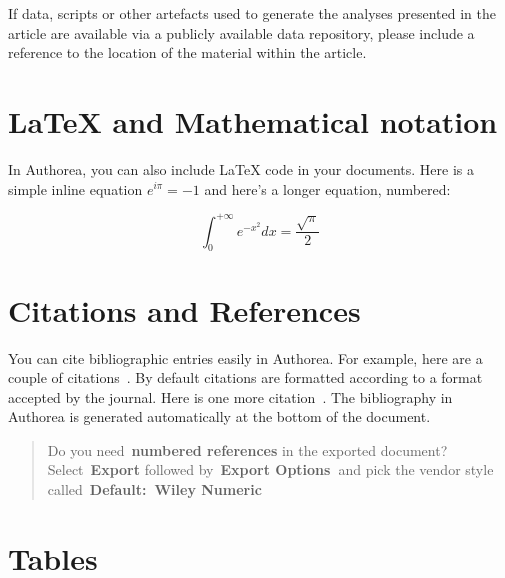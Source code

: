 \documentclass[alpha-refs]{wiley-article}
\begin{document}
{\label{182566}}

{}{If data, scripts or other artefacts used to generate the analyses
presented in the article are available via a publicly available data
repository, please include a reference to the location of the material
within the article.}

\par\null

\section*{LaTeX and Mathematical notation}
\label{sec:latex}
In Authorea, you can also include LaTeX code in your documents. Here is a simple inline equation $e^{i\pi}=-1$ and here's a longer equation, numbered:

\begin{equation}
\label{eqn:some}
\int_0^{+\infty}e^{-x^2}dx=\frac{\sqrt{\pi}}{2}
\end{equation}

\par\null

\section*{Citations and References}

{\label{203892}}

You can cite bibliographic entries easily in Authorea. For example, here
are a couple of citations~\cite{Cavalleri_2016,Gregory_2015}. By default citations are
formatted according to a format accepted by the journal. Here is one
more citation~\cite{Meskine_2019}. The bibliography in Authorea is
generated automatically at the bottom of the document.

\begin{quote}
Do you need~\textbf{numbered references} in the exported document?
Select~\textbf{Export} followed by~\textbf{Export Options~}and pick the
vendor style called~\textbf{Default:~Wiley Numeric}~
\end{quote}

\par\null

\section*{Tables}

{\label{336259}}
\end{document}
